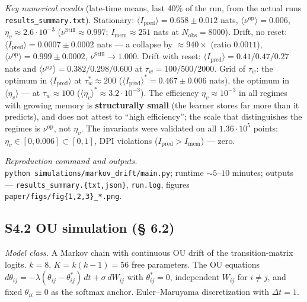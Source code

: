 \documentclass[pdflatex,sn-mathphys-ay]{sn-jnl}
\begin{document}
\emph{Key numerical results} (late-time means, last 40\% of the run, from the actual runs \texttt{results\_summary.txt}). Stationary: \(\langle I_{\text{pred}}\rangle = 0.658 \pm 0.012\) nats, \(\langle\nu^{\text{op}}\rangle = 0.006\), \(\eta_v \approx 2.6 \cdot 10^{-3}\) (\(\nu^{\text{Still}} \approx 0.997\); \(I_{\text{mem}} \approx 251\) nats at \(N_{\text{obs}} = 8000\)). Drift, no reset: \(\langle I_{\text{pred}}\rangle = 0.0007 \pm 0.0002\) nats --- a collapse by \(\approx 940\times\) (ratio \(0.0011\)), \(\langle\nu^{\text{op}}\rangle = 0.999 \pm 0.0002\), \(\nu^{\text{Still}} \to 1.000\). Drift with reset: \(\langle I_{\text{pred}}\rangle = 0.41 / 0.47 / 0.27\) nats and \(\langle\nu^{\text{op}}\rangle = 0.382 / 0.298 / 0.600\) at \(\tau_w = 100 / 500 / 2000\). Grid of \(\tau_w\): the optimum in \(\langle I_{\text{pred}}\rangle\) at \(\tau_w^* \approx 200\) (\(\langle I_{\text{pred}}\rangle^* = 0.467 \pm 0.006\) nats), the optimum in \(\langle\eta_v\rangle\) --- at \(\tau_w \approx 100\) (\(\langle\eta_v\rangle^* \approx 3.2 \cdot 10^{-3}\)). The efficiency \(\eta_v \approx 10^{-3}\) in all regimes with growing memory is \textbf{structurally small} (the learner stores far more than it predicts), and does not attest to ``high efficiency''; the scale that distinguishes the regimes is \(\nu^{\text{op}}\), not \(\eta_v\). The invariants were validated on all \(1.36 \cdot 10^5\) points: \(\eta_v \in [0, 0.006] \subset [0,1]\), DPI violations (\(I_{\text{pred}} > I_{\text{mem}}\)) --- zero.



\emph{Reproduction command and outputs.} \texttt{python\ simulations/markov\_drift/main.py}; runtime \(\sim 5\)--\(10\) minutes; outputs --- \texttt{results\_summary.\{txt,json\}}, \texttt{run.log}, figures \texttt{paper/figs/fig\{1,2,3\}\_*.png}.



\subsection*{S4.2 OU simulation (§ 6.2)}\label{s4.2-ou-simulation-6.2}



\emph{Model class.} A Markov chain with continuous OU drift of the transition-matrix logits. \(k = 8\), \(K = k(k-1) = 56\) free parameters. The OU equations \(d\theta_{ij} = -\lambda(\theta_{ij} - \theta_{ij}^*)\, dt + \sigma\, dW_{ij}\) with \(\theta_{ij}^* = 0\), independent \(W_{ij}\) for \(i \ne j\), and fixed \(\theta_{ii} \equiv 0\) as the softmax anchor. Euler--Maruyama discretization with \(\Delta t = 1\).
\end{document}
